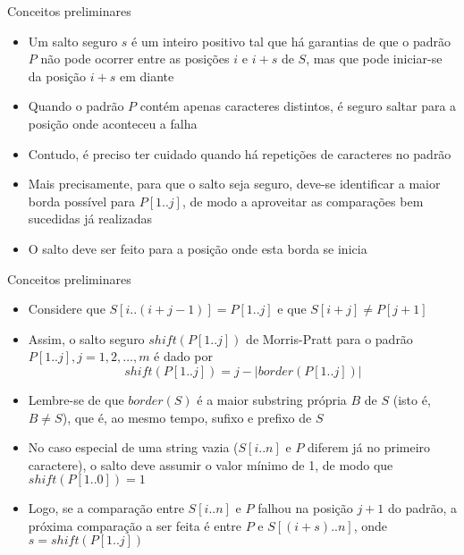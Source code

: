 \begin{frame}[fragile]{Conceitos preliminares}

    \begin{itemize}
        \item Um salto seguro $s$ é um inteiro positivo tal que há garantias de que o padrão $P$
            não pode ocorrer entre as posições $i$ e $i + s$ de $S$, mas que pode iniciar-se 
            da posição $i+s$ em diante

        \item Quando o padrão $P$ contém apenas caracteres distintos, é seguro saltar para a 
            posição onde aconteceu a falha

        \item Contudo, é preciso ter cuidado quando há repetições de caracteres no padrão

        \item Mais precisamente, para que o salto seja seguro, deve-se identificar a maior borda 
            possível para $P[1..j]$, de modo a aproveitar as comparações bem sucedidas já
            realizadas

        \item O salto deve ser feito para a posição onde esta borda se inicia

    \end{itemize}

\end{frame}

\begin{frame}[fragile]{Conceitos preliminares}

    \begin{itemize}
        \item Considere que $S[i..(i + j - 1)] = P[1..j]$ e que $S[i + j] \neq P[j + 1]$

        \item Assim, o salto seguro $shift(P[1..j])$ de Morris-Pratt para o padrão 
        $P[1..j], j = 1, 2, \ldots, m$ é dado por
        \[
            shift(P[1..j]) = j - |border(P[1..j])|
        \]

        \item Lembre-se de que $border(S)$ é a maior substring própria $B$ de $S$ (isto é,
            $B\neq S$), que é, ao mesmo tempo, sufixo e prefixo de $S$

        \item No caso especial de uma string vazia ($S[i..n]$ e $P$ diferem já no primeiro
            caractere), o salto deve assumir o valor mínimo de 1, de 
            modo que $shift(P[1..0]) = 1$

        \item Logo, se a comparação entre $S[i..n]$ e $P$ falhou na posição $j + 1$ do padrão,
            a próxima comparação a ser feita é entre $P$ e $S[(i + s)..n]$, onde
            $s = shift(P[1..j])$
    \end{itemize}

\end{frame}

